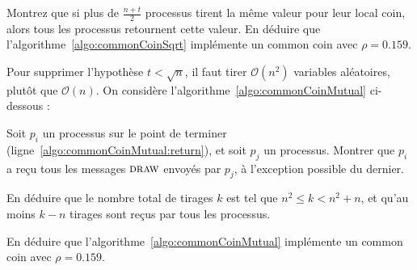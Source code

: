 \begin{exercice}
  \begin{questions}
  \item Montrez que si plus de $\frac{n+t}{2}$ processus tirent la même valeur pour leur local coin, alors tous les processus retournent cette valeur.
    En déduire que l'algorithme~\ref{algo:commonCoinSqrt} implémente un common coin avec $\rho = 0.159$. 
  \end{questions}
  
  Pour supprimer l'hypothèse $t<\sqrt{n}$, il faut tirer $\mathcal{O}(n^2)$ variables aléatoires, plutôt que $\mathcal{O}(n)$.
  On considère l'algorithme~\ref{algo:commonCoinMutual} ci-dessous :
  
  \begin{algorithm}
    \caption{Common coin dans le modèle $CAMP_{n,t}[\texttt{local\_coin}, causal-mutual-broadcast]$}
    \label{algo:commonCoinMutual}
  \end{algorithm}

  \begin{questions}
  \item Soit $p_i$ un processus sur le point de terminer (ligne~\ref{algo:commonCoinMutual:return}), et soit $p_j$ un processus.
    Montrer que $p_i$ a reçu tous les messages $\textsc{draw}$ envoyés par $p_j$, à l'exception possible du dernier. 
  \item En déduire que le nombre total de tirages $k$ est tel que $n^2 \le k < n^2 + n$, et qu'au moins $k-n$ tirages sont
    reçus par tous les processus. 
  \item En déduire que l'algorithme~\ref{algo:commonCoinMutual} implémente un common coin avec $\rho = 0.159$. 
  \end{questions}
\end{exercice}

\endgroup
\endinput
